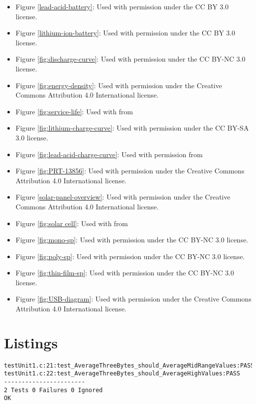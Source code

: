 \begin{itemize}
\item Figure \ref{lead-acid-battery}: Used with permission under the CC BY 3.0 license. \cite{Lead-Acid-Charging}
\item Figure \ref{lithium-ion-battery}: Used with permission under the CC BY 3.0 license. \cite{lithium-ion-battery}
\item Figure \ref{fig:discharge-curve}: Used with permission under the CC BY-NC 3.0 license. \cite{discharge-curve}
\item Figure \ref{fig:energy-density}: Used with permission under the Creative Commons Attribution 4.0 International license. \cite{energy-density}
\item Figure \ref{fig:service-life}: Used with from
\item Figure \ref{fig:lithium-charge-curve}: Used with permission under the CC BY-SA 3.0 license. \cite{lithium-charge-curve}
\item Figure \ref{fig:lead-acid-charge-curve}: Used with permission from
\item Figure \ref{fig:PRT-13856}: Used with permission under the Creative Commons Attribution 4.0 International license. \cite{PRT-13856}
\item Figure \ref{solar-panel-overview}: Used with permission under the Creative Commons Attribution 4.0 International license. \cite{solar-panel-overview}
\item Figure \ref{fig:solar cell}: Used with from
\item Figure \ref{fig:mono-sp}: Used with permission under the CC BY-NC 3.0 license. \cite{mono-sp}
\item Figure \ref{fig:poly-sp}: Used with permission under the CC BY-NC 3.0 license. \cite{poly-sp}
\item Figure \ref{fig:thin-film-sp}: Used with permission under the CC BY-NC 3.0 license. \cite{thin-film-sp}
\item Figure \ref{fig:USB-diagram}: Used with permission under the Creative Commons Attribution 4.0 International license. \cite{USB-diagram}

\end{itemize}

\newpage
\section{Listings}
\renewcommand{\lstlistlistingname}{}
\lstlistoflistings
\hfill

\begin{lstlisting}[label={lst:unity-report}, caption=Example Unity Test Report Output \cite{unity-homepage}]
testUnit1.c:21:test_AverageThreeBytes_should_AverageMidRangeValues:PASS
testUnit1.c:22:test_AverageThreeBytes_should_AverageHighValues:PASS
-----------------------
2 Tests 0 Failures 0 Ignored
OK
\end{lstlisting}

